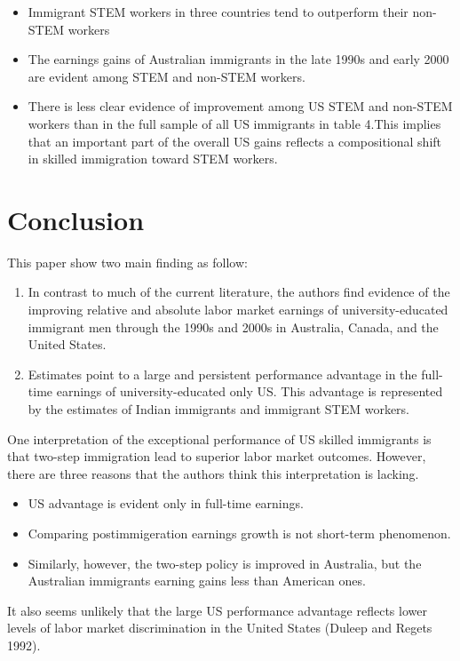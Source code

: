 \documentclass[../root]{subfiles}
\begin{document}
    \begin{itemize}
        \item Immigrant STEM workers in three countries tend to outperform their non-STEM workers
        \item The earnings gains of Australian immigrants in the late 1990s and early 2000 are evident among STEM and non-STEM workers.   
        \item There is less clear evidence of improvement among US STEM and non-STEM workers than in the full sample of all US immigrants in table 4.This implies that an important part of the overall US gains reflects a compositional shift in skilled immigration toward STEM workers. 
    \end{itemize}
    
    
    \section{Conclusion}
    This paper show two main finding as follow:
    
    \begin{enumerate}
        \item In contrast to much of the current literature, the authors find evidence of the improving relative and absolute labor market earnings of university-educated immigrant men through the 1990s and 2000s in Australia, Canada, and the United States. 
        \item Estimates point to a large and persistent performance advantage in the full-time earnings of university-educated only US. This advantage is represented by the estimates of Indian immigrants and immigrant STEM workers.
    \end{enumerate}
      
    One interpretation of the exceptional performance of US skilled immigrants is that two-step immigration lead to superior labor market outcomes. However, there are three reasons that the authors think this interpretation is lacking.
    
    \begin{itemize}
        \item US advantage is evident only in full-time earnings.
        \item Comparing postimmigeration earnings growth is not short-term phenomenon.
        \item Similarly, however, the two-step policy is improved in  Australia, but the Australian immigrants earning gains less than American ones.
    \end{itemize}
    
    It also seems unlikely that the large US performance advantage reflects lower levels of labor market discrimination in the United States (Duleep and Regets 1992).
    
    \biblio
    
\end{document}
